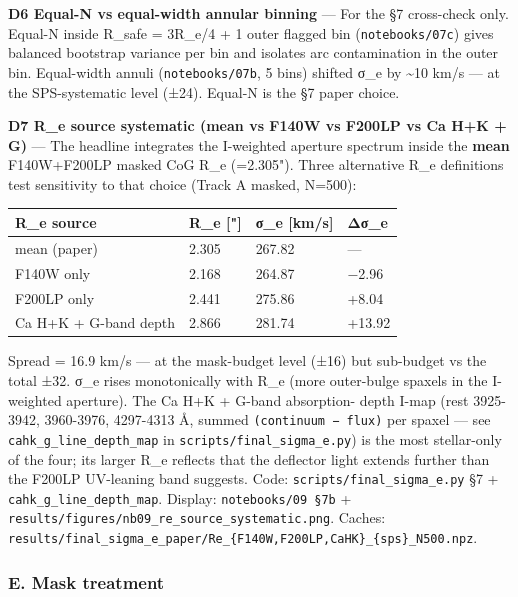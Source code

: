 \documentclass[
  10pt,
]{article}
\begin{document}
\textbf{D6 Equal-N vs equal-width annular binning} --- For the §7 cross-check only. Equal-N inside R\_safe = 3R\_e/4 + 1 outer flagged bin (\texttt{notebooks/07c}) gives balanced bootstrap variance
per bin and isolates arc contamination in the outer bin. Equal-width annuli (\texttt{notebooks/07b}, 5 bins) shifted σ\_e by \textasciitilde10 km/s --- at the SPS-systematic level (±24). Equal-N is
the §7 paper choice.

\textbf{D7 R\_e source systematic (mean vs F140W vs F200LP vs Ca H+K + G)} --- The headline integrates the I-weighted aperture spectrum inside the \textbf{mean} F140W+F200LP masked CoG R\_e (=2.305").
Three alternative R\_e definitions test sensitivity to that choice (Track A masked, N=500):

\begingroup\small\setlength{\tabcolsep}{4pt}\begin{longtable}[]{@{}llll@{}}
\toprule
R\_e source & R\_e {[}"{]} & σ\_e {[}km/s{]} & Δσ\_e \\
\midrule
\endhead
mean (paper) & 2.305 & 267.82 & --- \\
F140W only & 2.168 & 264.87 & −2.96 \\
F200LP only & 2.441 & 275.86 & +8.04 \\
Ca H+K + G-band depth & 2.866 & 281.74 & +13.92 \\
\bottomrule
\end{longtable}\endgroup

Spread = 16.9 km/s --- at the mask-budget level (±16) but sub-budget vs the total ±32. σ\_e rises monotonically with R\_e (more outer-bulge spaxels in the I-weighted aperture). The Ca H+K + G-band
absorption- depth I-map (rest 3925-3942, 3960-3976, 4297-4313 Å, summed \texttt{(continuum\ −\ flux)} per spaxel --- see \texttt{cahk\_g\_line\_depth\_map} in \texttt{scripts/final\_sigma\_e.py}) is
the most stellar-only of the four; its larger R\_e reflects that the deflector light extends further than the F200LP UV-leaning band suggests. Code: \texttt{scripts/final\_sigma\_e.py} §7 +
\texttt{cahk\_g\_line\_depth\_map}. Display: \texttt{notebooks/09\ §7b} + \texttt{results/figures/nb09\_re\_source\_systematic.png}. Caches:
\texttt{results/final\_sigma\_e\_paper/Re\_\{F140W,F200LP,CaHK\}\_\{sps\}\_N500.npz}.

\hypertarget{e.-mask-treatment}{%
\subsubsection{E. Mask treatment}\label{e.-mask-treatment}}
\end{document}
